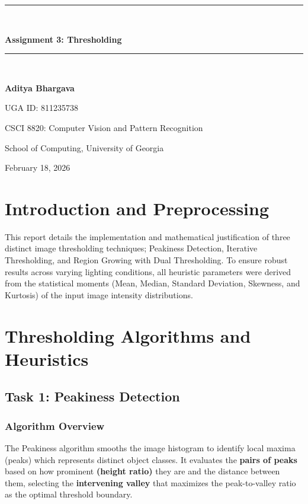 \documentclass[11pt, letterpaper]{article}
\begin{document}
\begin{titlepage}
    \centering
    \vspace*{1.5in}
    \rule{\linewidth}{0.5mm} \\[0.4cm]
    {\huge \bfseries Assignment 3: Thresholding \par}
    \rule{\linewidth}{0.5mm} \\[1.5cm]
    
    \vspace{0.3in}
    {\Large \textbf{Aditya Bhargava} \par}
    {\large UGA ID: 811235738 \par}
    
    \vfill
    {\large CSCI 8820: Computer Vision and Pattern Recognition \par}
    {\large School of Computing, University of Georgia \par}
    {\large February 18, 2026 \par}
\end{titlepage}

\newpage
\tableofcontents
\newpage

\section{Introduction and Preprocessing}
This report details the implementation and mathematical justification of three distinct image thresholding techniques; Peakiness Detection, Iterative Thresholding, and Region Growing with Dual Thresholding. To ensure robust results across varying lighting conditions, all heuristic parameters were derived from the statistical moments (Mean, Median, Standard Deviation, Skewness, and Kurtosis) of the input image intensity distributions.

\section{Thresholding Algorithms and Heuristics}

\subsection{Task 1: Peakiness Detection}
\subsubsection{Algorithm Overview}
The Peakiness algorithm smooths the image histogram to identify local maxima (peaks) which represents distinct object classes. It evaluates the \textbf{pairs of peaks} based on how prominent \textbf{(height ratio)} they are and the distance between them, selecting the \textbf{intervening valley} that maximizes the peak-to-valley ratio as the optimal threshold boundary.
\end{document}
